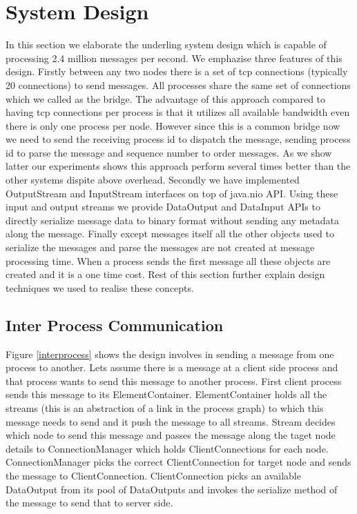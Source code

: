 \section{System Design}
In this section we elaborate the underling system design which is capable of processing 2.4 million messages per second. We emphazise three features of this design. Firstly between any two nodes there is a set of tcp connections (typically 20 connections)  to send messages. All processes share the same set of connections which we called as the bridge. The advantage of this approach compared to having tcp connections per process is that it utilizes all available bandwidth even there is only one process per node. However since this is a common bridge now we need to send the receiving process id to dispatch the message, sending  process id to parse the message and sequence number to order messages. As we show latter our experiments shows this approach perform several times better than the other systems dispite above overhead. Secondly we have implemented OutputStream and InputStream interfaces on top of java.nio API. Using these input and output streams we provide DataOutput and DataInput APIs to directly serialize message data to binary format without sending any metadata along the message. Finally except messages itself all the other objects used to serialize the messages and parse the messages are not created at message processing time. When a process sends the first message all these objects are created and it is a one time cost. Rest of this section further explain design techniques we used to realise these concepts.
\subsection{Inter Process Communication}
Figure \ref{interprocess} shows the design involves in sending a message from one process to another. Lets assume there is a message at a client side process and that process wants to send this message to another process. First client process sends this message to its ElementContainer. ElementContainer holds all the streams (this is an abstraction of a link in the process graph) to which this message needs to send and it push the message to all streams. Stream decides which node to send this message and passes the message along the taget node details to ConnectionManager which holds ClientConnections for each node. ConnectionManager picks the correct ClientConnection for target node and sends the message to ClientConnection. ClientConnection picks an available DataOutput from its pool of DataOutputs and invokes the serialize method of the message to send that to server side.

